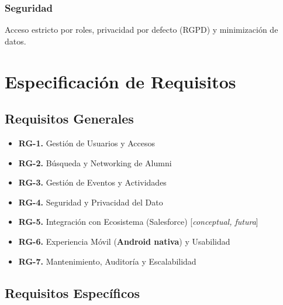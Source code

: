 \documentclass{report}
\begin{document}
\subsubsection{Seguridad}
Acceso estricto por roles, privacidad por defecto (RGPD) y minimización de datos.

\section{Especificación de Requisitos}
\subsection{Requisitos Generales}
\begin{itemize}
    \item \textbf{RG-1.} Gestión de Usuarios y Accesos
    \item \textbf{RG-2.} Búsqueda y Networking de Alumni
    \item \textbf{RG-3.} Gestión de Eventos y Actividades
    \item \textbf{RG-4.} Seguridad y Privacidad del Dato
    \item \textbf{RG-5.} Integración con Ecosistema (Salesforce) [\textit{conceptual, futura}]
    \item \textbf{RG-6.} Experiencia Móvil (\textbf{Android nativa}) y Usabilidad
    \item \textbf{RG-7.} Mantenimiento, Auditoría y Escalabilidad
\end{itemize}

\subsection{Requisitos Específicos}
\end{document}
